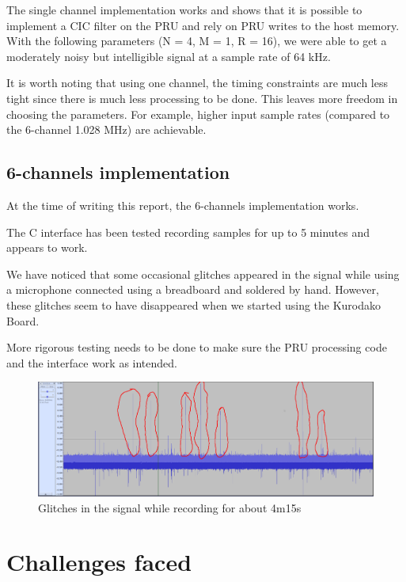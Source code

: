 \documentclass[]{report}
\begin{document}
The single channel implementation works and shows that it is possible to implement a CIC filter on the PRU and rely on PRU writes to the host memory. With the following parameters (N = 4, M = 1, R = 16), we were able to get a moderately noisy but intelligible signal at a sample rate of 64 kHz.

It is worth noting that using one channel, the timing constraints are much less tight since there is much less processing to be done. This leaves more freedom in choosing the parameters. For example, higher input sample rates (compared to the 6-channel 1.028 MHz) are achievable.

\hypertarget{channels-implementation}{%
\section{6-channels implementation}\label{channels-implementation}}

At the time of writing this report, the 6-channels implementation works.

The C interface has been tested recording samples for up to 5 minutes and appears to work.

We have noticed that some occasional glitches appeared in the signal while using a microphone connected using a breadboard and soldered by hand. However, these glitches seem to have disappeared when we started using the Kurodako Board.

More rigorous testing needs to be done to make sure the PRU processing code and the interface work as intended.

\begin{figure}[h]
\centering
\includegraphics[width=0.8\linewidth]{Pictures/glitches_circled.png}
\caption{Glitches in the signal while recording for about 4m15s}
\end{figure}

\hypertarget{challenges-faced}{%
\chapter{Challenges faced}\label{challenges-faced}}
\end{document}
